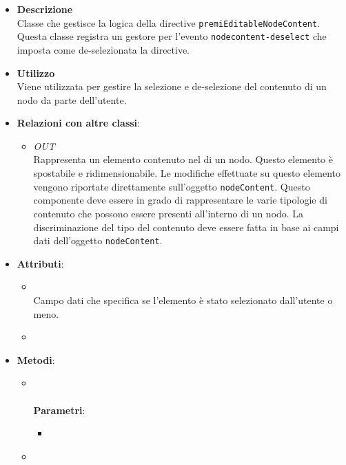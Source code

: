 \begin{itemize}
\item \textbf{Descrizione}\\
Classe che gestisce la logica della directive \texttt{premiEditableNodeContent}. Questa classe registra un gestore per l'evento \texttt{nodecontent-deselect} che imposta come de-selezionata la directive.
\item \textbf{Utilizzo}\\
Viene utilizzata per gestire la selezione e de-selezione del contenuto di un nodo da parte dell'utente.
\item \textbf{Relazioni con altre classi}:
\begin{itemize}
\item \textit{OUT} \hyperref[\nogloxy{Premi::Front-End::Directives::premiEditableNodeContent}]{}\\
Rappresenta un elemento contenuto nel  di un nodo. Questo elemento è spostabile e ridimensionabile. Le modifiche effettuate su questo elemento vengono riportate direttamente sull’oggetto \texttt{nodeContent}.
Questo componente deve essere in grado di rappresentare le varie tipologie di contenuto che possono essere presenti all’interno di un nodo. La discriminazione del tipo del contenuto deve essere fatta in base ai campi dati dell’oggetto \texttt{nodeContent}.
\end{itemize}
\item \textbf{Attributi}:
\begin{itemize}
\item {}
\\ Campo dati che specifica se l'elemento è stato selezionato dall'utente o meno.
\item {}
\\ \dpScopeField
\end{itemize}
\item \textbf{Metodi}:
\begin{itemize}
\item {}
\\ \dpConstructor
\\ \textbf{Parametri}:
\begin{itemize}
\item {}
\\ \dpScopeParam
\end{itemize}
\item {}

\end{itemize}
\end{itemize}
